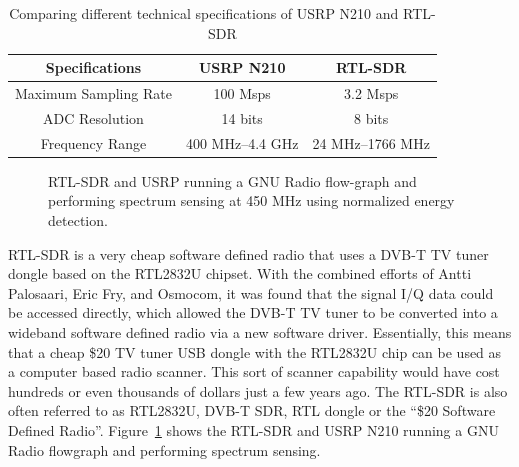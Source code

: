 \begin{table}[!ht]
\caption{Comparing different technical specifications of USRP N210 and RTL-SDR}
\centering
\begin{tabular}{| c | c | c |}
\toprule
Specifications  & USRP N210 & RTL-SDR \\ \hline
Maximum Sampling Rate  & 100 Msps  & 3.2 Msps\\ \hline
ADC Resolution  & 14 bits  & 8 bits\\ \hline
Frequency Range  & 400 MHz--4.4 GHz  & 24 MHz--1766 MHz\\
\bottomrule
\end{tabular}
\label{usrprtl}
\end{table}

\begin{figure}[t!]
  \begin{center}
  \hspace{1mm}
   \hspace{1mm}
     \caption{RTL-SDR and USRP running a GNU Radio flow-graph and performing spectrum sensing at 450 MHz using normalized energy detection.} 
\label{usrprtl}      
   \end{center}
\end{figure}

RTL-SDR is a very cheap software defined radio that uses a DVB-T TV tuner dongle based on the RTL2832U chipset. With the combined efforts of Antti Palosaari, Eric Fry, and Osmocom, it was found that the signal I/Q data could be accessed directly, which allowed the DVB-T TV tuner to be converted into a wideband software defined radio via a new software driver. Essentially, this means that a cheap \$20 TV tuner USB dongle with the RTL2832U chip can be used as a computer based radio scanner. This sort of scanner capability would have cost hundreds or even thousands of dollars just a few years ago. The RTL-SDR is also often referred to as RTL2832U, DVB-T SDR, RTL dongle or the “\$20 Software Defined Radio”. Figure~\ref{usrprtl} shows the RTL-SDR and USRP N210 running a GNU Radio flowgraph and performing spectrum sensing.


